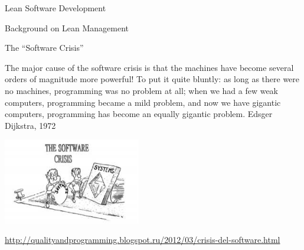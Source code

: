 \documentclass{beamer}
\begin{document}

\begin{frame}{\centerline{Lean Software Development}}
\begin{center}
\LARGE
Background on Lean Management
\end{center}
\end{frame}

\begin{frame}{\centerline{The ``Software Crisis''}}
The major cause of the software crisis is that the machines have become several orders of magnitude more powerful! To put it quite bluntly: as long as there were no machines, programming was no problem at all; when we had a few weak computers, programming became a mild problem, and now we have gigantic computers, programming has become an equally gigantic problem.
Edsger Dijkstra, 1972

\begin{center}
\includegraphics[width=60mm]{A2022.IDSEPC.ProcessoDiProduzione/pic-01.png}
\end{center}



\begin{center}
\tiny
\url{http://qualityandprogramming.blogspot.ru/2012/03/crisis-del-software.html}
\end{center}

\end{frame}
\end{document}

